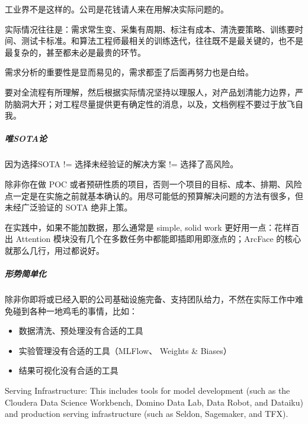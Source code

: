\documentclass[letterpaper,11pt,english]{sphinxmanual}
\begin{document}
工业界不是这样的。公司是花钱请人来在用解决实际问题的。

实际情况往往是：需求常生变、采集有周期、标注有成本、清洗要策略、训练要时间、测试卡标准。和算法工程师最相关的训练迭代，往往既不是最关键的，也不是最复杂的，甚至都未必是最贵的环节。

需求分析的重要性是显而易见的，需求都歪了后面再努力也是白给。

要对全流程有所理解，然后根据实际情况坚持以理服人，对产品划清能力边界，严防脑洞大开；对工程尽量提供更有确定性的消息，以及，文档例程不要过于放飞自我。


\subparagraph{唯SOTA论}
\label{\detokenize{chapter_introduction/AI_PM:sota}}
因为选择SOTA != 选择未经验证的解决方案 != 选择了高风险。

除非你在做 POC
或者预研性质的项目，否则一个项目的目标、成本、排期、风险点一定是在实施之前就基本确认的。用尽可能低的预算解决问题的方法有很多，但未经广泛验证的
SOTA 绝非上策。

在实践中，如果不能加数据，那么通常是 simple, solid work
更好用一点：花样百出 Attention
模块没有几个在多数任务中都能即插即用即涨点的；ArcFace
的核心就那么几行，用过都说好。


\subparagraph{形势简单化}
\label{\detokenize{chapter_introduction/AI_PM:id26}}
除非你即将或已经入职的公司基础设施完备、支持团队给力，不然在实际工作中难免碰到各种一地鸡毛的事情，比如：
\begin{itemize}
\item {} 
数据清洗、预处理没有合适的工具

\item {} 
实验管理没有合适的工具（MLFlow、 Weights \& Biases）

\item {} 
结果可视化没有合适的工具

\end{itemize}

Serving Infrastructure: This includes tools for model development (such
as the Cloudera Data Science Workbench, Domino Data Lab, Data Robot, and
Dataiku) and production serving infrastructure (such as Seldon,
Sagemaker, and TFX).
%
\begin{footnote}[99]\sphinxAtStartFootnote
{}
%
\end{footnote}
\end{document}

